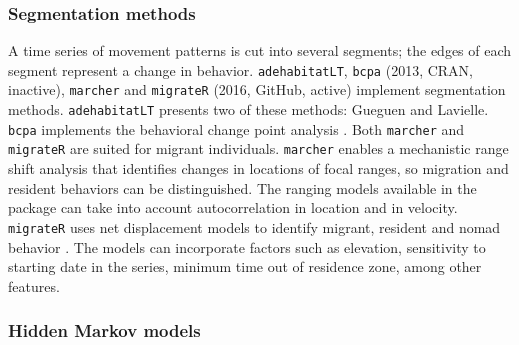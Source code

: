 \documentclass[a4paper,12pt]{article}
\newcommand{\Rpkg}[1]{\texttt{#1}}
\begin{document}
\subsubsection*{Segmentation methods}

A time series of movement patterns is cut into several segments; the edges of each segment represent a change in behavior. \Rpkg{adehabitatLT}, \Rpkg{bcpa} (2013, CRAN, inactive), \Rpkg{marcher} and \Rpkg{migrateR} (2016, GitHub, active) implement segmentation methods. \Rpkg{adehabitatLT} presents two of these methods: Gueguen and Lavielle. \Rpkg{bcpa} implements the behavioral change point analysis \citep{Gurarie2009}. Both \Rpkg{marcher} and \Rpkg{migrateR} are suited for migrant individuals. \Rpkg{marcher} enables a mechanistic range shift analysis \citep{Gurarie2017} that identifies changes in locations of focal ranges, so migration and resident behaviors can be distinguished. The ranging models available in the package can take into account autocorrelation in location and in velocity. \Rpkg{migrateR} uses net displacement models to identify migrant, resident and nomad behavior \citep{Spitz2017}. The models can incorporate factors such as elevation, sensitivity to starting date in the series, minimum time out of residence zone, among other features.  

\subsubsection*{Hidden Markov models}
\end{document}
